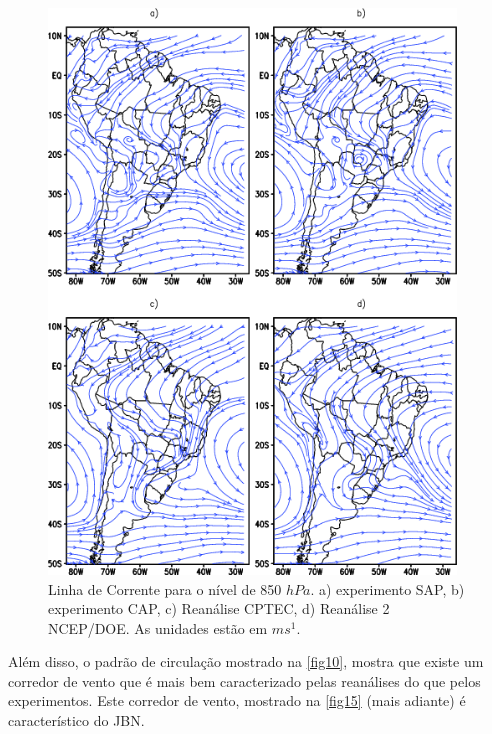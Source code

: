\begin{figure}[!hbp]
\centering
\includegraphics[height=15cm]{./figs/media_corrente_anl_850hPa.png}
\caption{Linha de Corrente para o nível de 850 $hPa$. a) experimento SAP, b) experimento CAP, c) Reanálise CPTEC, d) Reanálise 2 NCEP/DOE. As unidades estão em $ms^{1}$.}
\label{fig10}
\end{figure}

Além disso, o padrão de circulação mostrado na \autoref{fig10}, mostra que existe um corredor de vento que é mais bem caracterizado pelas reanálises do que pelos experimentos. Este corredor de vento, mostrado na \autoref{fig15} (mais adiante) é característico do JBN. 

